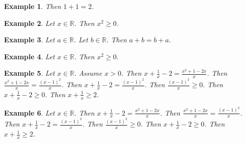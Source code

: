 \documentclass[12pt]{article}
\newtheorem{example}{Example}
\begin{document}

\begin{example}
    Then $1+1=2$.
\end{example}

\begin{example}
    Let $x\in\mathbb{R}$. Then $x^2\ge 0$.
\end{example}

\begin{example}
    Let $a\in\mathbb{R}$. Let $b\in\mathbb{R}$. Then $a+b=b+a$.
\end{example}

\begin{example}
    Let $x\in\mathbb{R}$. Then $x^2 \ge 0$.
\end{example}

\begin{example}
    Let $x\in\mathbb{R}$. Assume $x>0$. Then $x + \frac{1}{x} - 2 = \frac{x^2 + 1 - 2x}{x}$.
    Then $\frac{x^2 + 1 - 2x}{x} = \frac{{(x-1)}^2}{x}$.
    Then $x + \frac{1}{x} - 2 = \frac{{(x-1)}^2}{x}$.
    Then $\frac{{(x-1)}^2}{x} \ge 0$.
    Then $x + \frac{1}{x} - 2 \ge 0$.
    Then $x + \frac{1}{x} \ge 2$.
\end{example}
\begin{example}
    Let $x\in\mathbb{R}$. Then $x + \frac{1}{x} - 2 = \frac{x^2 + 1 - 2x}{x}$.
    Then $\frac{x^2 + 1 - 2x}{x} = \frac{{(x-1)}^2}{x}$.
    Then $x + \frac{1}{x} - 2 = \frac{{(x-1)}^2}{x}$.
    Then $\frac{{(x-1)}^2}{x} \ge 0$.
    Then $x + \frac{1}{x} - 2 \ge 0$.
    Then $x + \frac{1}{x} \ge 2$.
\end{example}




\end{document}

